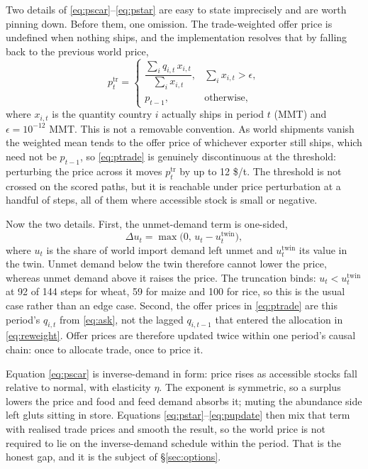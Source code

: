 Two details of \eqref{eq:pscar}--\eqref{eq:pstar} are easy to state
imprecisely and are worth pinning down. Before them, one omission. The
trade-weighted offer price is undefined when nothing ships, and the
implementation resolves that by falling back to the previous world price,
\begin{equation}
p^{\mathrm{tr}}_t=
\begin{cases}
\dfrac{\sum_i q_{i,t}\,x_{i,t}}{\sum_i x_{i,t}}, & \sum_i x_{i,t}>\epsilon,\\[2ex]
p_{t-1}, & \text{otherwise,}
\end{cases}
\label{eq:ptrade}
\end{equation}
where \(x_{i,t}\) is the quantity country \(i\) actually ships in period
\(t\) (MMT) and \(\epsilon=10^{-12}\) MMT. This is not a removable
convention. As world shipments vanish the weighted mean tends to the offer
price of whichever exporter still ships, which need not be \(p_{t-1}\), so
\eqref{eq:ptrade} is genuinely discontinuous at the threshold: perturbing
the price across it moves \(p^{\mathrm{tr}}_t\) by up to 12 \$/t. The
threshold is not crossed on the scored paths, but it is reachable under
price perturbation at a handful of steps, all of them where accessible
stock is small or negative.

Now the two details. First, the unmet-demand term is
one-sided,
\begin{equation}
\Delta u_t=\max\bigl(0,\,u_t-u^{\mathrm{twin}}_t\bigr),
\label{eq:unmet}
\end{equation}
where \(u_t\) is the share of world import demand left unmet and
\(u^{\mathrm{twin}}_t\) its value in the twin. Unmet demand below the twin
therefore cannot lower the price, whereas unmet demand above it raises the
price. The truncation binds: \(u_t<u^{\mathrm{twin}}_t\) at 92 of 144 steps
for wheat, 59 for maize and 100 for rice, so this is the usual case rather
than an edge case. Second, the offer prices in \eqref{eq:ptrade} are this
period's \(q_{i,t}\) from \eqref{eq:ask}, not the lagged \(q_{i,t-1}\) that
entered the allocation in \eqref{eq:reweight}. Offer prices are therefore updated twice within one
period's causal chain: once to allocate trade, once to price it.

Equation \eqref{eq:pscar} is inverse-demand in form: price rises as
accessible stocks fall relative to normal, with elasticity \(\eta\). The
exponent is symmetric, so a surplus lowers the price and food and feed
demand absorbs it; muting the abundance side left gluts sitting in store.
Equations \eqref{eq:pstar}--\eqref{eq:pupdate} then mix that term with
realised trade prices and smooth the result, so the world price is not
required to lie on the inverse-demand schedule within the period. That is
the honest gap, and it is the subject of \S\ref{sec:options}.

